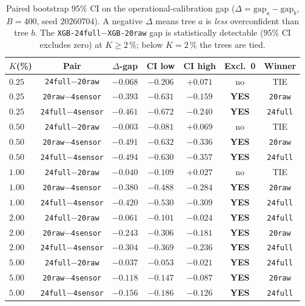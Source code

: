 \documentclass{article}
\begin{document}
\begin{table}[t]
\centering
\small
\caption{Paired bootstrap $95\%$ CI on the operational-calibration gap
($\Delta = \text{gap}_a - \text{gap}_b$, $B{=}400$, seed $20260704$).
A negative $\Delta$ means tree $a$ is \emph{less} overconfident than
tree $b$. The \texttt{XGB-24full}${-}$\texttt{XGB-20raw} gap is
statistically detectable ($95\%$ CI excludes zero) at
$K \ge 2\,\%$; below $K{=}2\,\%$ the trees are tied.}
\label{tab:p8-op-cal-boot}
\begin{tabular}{lcccccc}
\toprule
$K$(\%) & Pair & $\Delta$-gap & CI low & CI high & Excl.\ 0 & Winner \\
\midrule
$0.25$ & \texttt{24full}${-}$\texttt{20raw}   & $-0.068$ & $-0.206$ & $+0.071$  & no  & TIE \\
$0.25$ & \texttt{20raw}${-}$\texttt{4sensor}  & $-0.393$ & $-0.631$ & $-0.159$  & \textbf{YES} & \texttt{20raw} \\
$0.25$ & \texttt{24full}${-}$\texttt{4sensor} & $-0.461$ & $-0.672$ & $-0.240$  & \textbf{YES} & \texttt{24full} \\
$0.50$ & \texttt{24full}${-}$\texttt{20raw}   & $-0.003$ & $-0.081$ & $+0.069$  & no  & TIE \\
$0.50$ & \texttt{20raw}${-}$\texttt{4sensor}  & $-0.491$ & $-0.632$ & $-0.336$  & \textbf{YES} & \texttt{20raw} \\
$0.50$ & \texttt{24full}${-}$\texttt{4sensor} & $-0.494$ & $-0.630$ & $-0.357$  & \textbf{YES} & \texttt{24full} \\
$1.00$ & \texttt{24full}${-}$\texttt{20raw}   & $-0.040$ & $-0.109$ & $+0.027$  & no  & TIE \\
$1.00$ & \texttt{20raw}${-}$\texttt{4sensor}  & $-0.380$ & $-0.488$ & $-0.284$  & \textbf{YES} & \texttt{20raw} \\
$1.00$ & \texttt{24full}${-}$\texttt{4sensor} & $-0.420$ & $-0.530$ & $-0.309$  & \textbf{YES} & \texttt{24full} \\
$2.00$ & \texttt{24full}${-}$\texttt{20raw}   & $-0.061$ & $-0.101$ & $-0.024$  & \textbf{YES} & \texttt{24full} \\
$2.00$ & \texttt{20raw}${-}$\texttt{4sensor}  & $-0.243$ & $-0.306$ & $-0.181$  & \textbf{YES} & \texttt{20raw} \\
$2.00$ & \texttt{24full}${-}$\texttt{4sensor} & $-0.304$ & $-0.369$ & $-0.236$  & \textbf{YES} & \texttt{24full} \\
$5.00$ & \texttt{24full}${-}$\texttt{20raw}   & $-0.037$ & $-0.053$ & $-0.021$  & \textbf{YES} & \texttt{24full} \\
$5.00$ & \texttt{20raw}${-}$\texttt{4sensor}  & $-0.118$ & $-0.147$ & $-0.087$  & \textbf{YES} & \texttt{20raw} \\
$5.00$ & \texttt{24full}${-}$\texttt{4sensor} & $-0.156$ & $-0.186$ & $-0.126$  & \textbf{YES} & \texttt{24full} \\
\bottomrule
\end{tabular}
\end{table}
\end{document}
